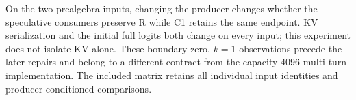 On the two prealgebra inputs, changing the producer changes whether the speculative consumers preserve R while C1 retains the same endpoint. KV serialization and the initial full logits both change on every input; this experiment does not isolate KV alone. These boundary-zero, $k=1$ observations precede the later repairs and belong to a different contract from the capacity-4096 multi-turn implementation. The included matrix retains all individual input identities and producer-conditioned comparisons.
\FloatBarrier
